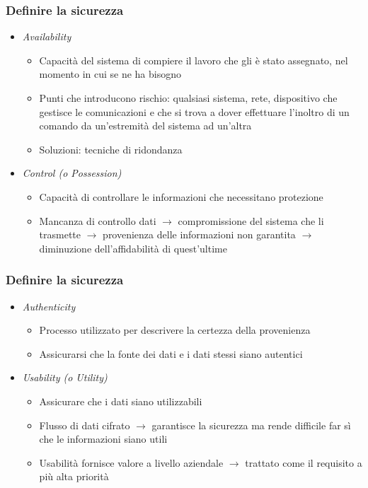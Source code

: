 \begin{frame}
  \frametitle{Definire la sicurezza}
  \begin{itemize}[<+- | alert@+>]
  \item \textit{Availability}
  	\begin{itemize}
  	\item Capacità del sistema di compiere il lavoro che gli è stato assegnato, nel momento in cui se ne ha bisogno 
  	\item Punti che introducono rischio: qualsiasi sistema, rete, dispositivo che gestisce le comunicazioni e che si trova a dover effettuare l'inoltro di un comando da un’estremità del sistema ad un’altra
  	\item Soluzioni: tecniche di ridondanza
  	\end{itemize}
  \item \textit{Control (o Possession)}
  	\begin{itemize}
  	\item Capacità di controllare le informazioni che necessitano protezione
  	\item Mancanza di controllo dati $\rightarrow$  compromissione del sistema che li trasmette $\rightarrow$ provenienza delle informazioni non garantita $\rightarrow$ diminuzione dell'affidabilità di quest'ultime
  	\end{itemize}
  \end{itemize}
\end{frame}

\begin{frame}
  \frametitle{Definire la sicurezza}
  \begin{itemize}[<+- | alert@+>]
  \item \textit{Authenticity}
  	\begin{itemize}
  	\item Processo utilizzato per descrivere la certezza della provenienza
  	\item Assicurarsi che la fonte dei dati e i dati stessi siano autentici
  	\end{itemize}
  \item \textit{Usability (o Utility)}
  \begin{itemize}
  \item Assicurare che i dati siano utilizzabili
  \item Flusso di dati cifrato $\rightarrow$ garantisce la sicurezza ma rende difficile far sì che le informazioni siano utili
  \item Usabilità fornisce valore a livello aziendale $\rightarrow$ trattato come il requisito a più alta priorità
  \end{itemize}
  \end{itemize}
\end{frame}

